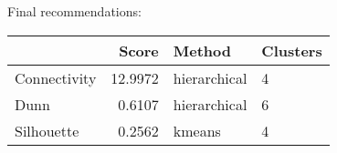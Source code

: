 \documentclass[11p]{article}
\begin{document}
Final recommendations:
\begin{table}[H]
\centering
\begin{tabular}{lrll}
\hline
& Score & Method & Clusters \\
\hline
Connectivity & 12.9972 & hierarchical & 4 \\
Dunn & 0.6107 & hierarchical & 6 \\
Silhouette & 0.2562 & kmeans & 4 \\
\hline
\end{tabular}
\end{table}


\newpage

%
\end{document}
